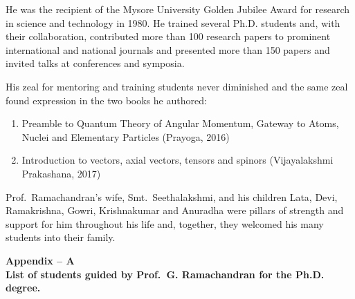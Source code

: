 He was the recipient of the Mysore University Golden Jubilee Award for research in science and technology in 1980. He trained several Ph.D. students and, with their collaboration, contributed more than 100 research papers to prominent international and national journals and presented more than 150 papers and invited talks at conferences and symposia.

His zeal for mentoring and training students never diminished and the same zeal found expression in the two books he authored:
\begin{enumerate}
\item Preamble to Quantum Theory of Angular Momentum, Gateway to Atoms, Nuclei and Elementary Particles (Prayoga, 2016)

\item Introduction to vectors, axial vectors, tensors and spinors (Vijayalakshmi Prakashana, 2017)
\end{enumerate}

Prof.\ Ramachandran's wife, Smt.\ Seethalakshmi, and his children Lata, Devi, Ramakrishna, Gowri, Krishnakumar and Anuradha were pillars of strength and support for him throughout his life and, together, they welcomed his many students into their family.

\eject

\begin{center}
\textbf{Appendix -- A}\\[4pt]
\textbf{List of students guided by Prof.\ G. Ramachandran for the Ph.D. degree.}
\end{center}

